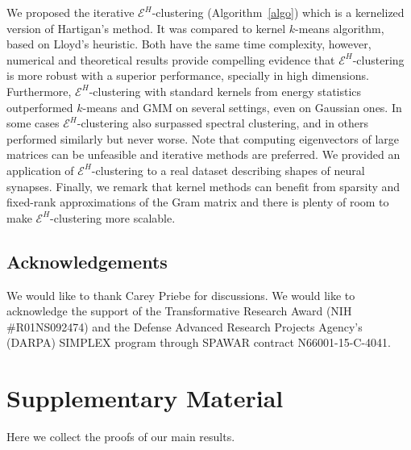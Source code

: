 \documentclass{article}
\begin{document}
We proposed the iterative $\mathcal{E}^H$-clustering 
(Algorithm~\ref{algo})
which is 
a kernelized version of Hartigan's method. 
It was compared to kernel $k$-means algorithm,
based on Lloyd's heuristic.
Both have the same time complexity, however, numerical and theoretical
results provide compelling evidence that $\mathcal{E}^H$-clustering
is more robust with a superior performance, specially in high
dimensions. 
Furthermore, $\mathcal{E}^H$-clustering with standard kernels from energy
statistics outperformed $k$-means and GMM
on several settings, even on Gaussian ones.
In some cases
$\mathcal{E}^H$-clustering also surpassed spectral clustering, and in
others performed similarly but never worse. 
Note that computing eigenvectors
of large matrices can be unfeasible and iterative methods are preferred.
We provided an application of $\mathcal{E}^H$-clustering to a real dataset
describing shapes of neural synapses.
Finally, we remark that kernel methods can benefit from sparsity and
fixed-rank approximations of the Gram matrix and there is plenty
of room to make $\mathcal{E}^H$-clustering more scalable.


\subsection*{Acknowledgements}
We would like to thank Carey Priebe 
for discussions.
We would like to acknowledge the support of the Transformative
Research Award (NIH \#R01NS092474) and  the Defense Advanced Research Projects
Agency’s (DARPA) SIMPLEX program through SPAWAR contract N66001-15-C-4041.





\clearpage

\appendix

\section{Supplementary Material}

Here we collect the proofs of our main results.
\end{document}

